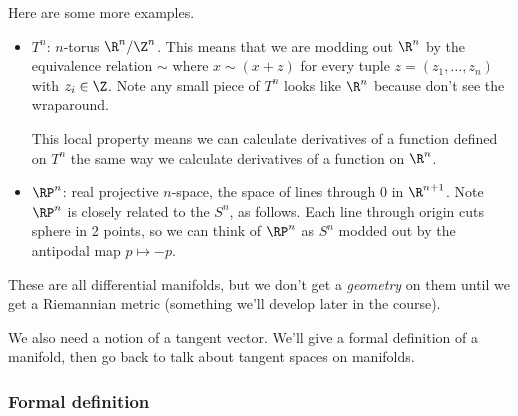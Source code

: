 Here are some more examples.
\begin{itemize}
\item
$T^n$: $n$-torus $\R^n/\Z^n$. This means that we are modding out $\R^n$ by the equivalence relation $\sim$ where $x\sim (x+z)$ for every tuple $z=(z_1,\ldots, z_n)$ with $z_i\in \Z$. Note any small piece of $T^n$ looks like $\R^n$ because don't see the wraparound. 

This local property means we can calculate derivatives of a function defined on $T^n$ the same way we calculate derivatives of a function on $\R^n$.
\item
$\RP^n$: real projective $n$-space, the space of lines through 0 in $\R^{n+1}$. Note $\RP^n$ is closely related to the $S^n$, as follows. Each line through origin cuts sphere in 2 points, so we can think of $\RP^n$ as $S^n$ modded out by the antipodal map $p\mapsto -p$.
\end{itemize}
These are all differential manifolds, %
but we don't get a {\it geometry} on them until we get a Riemannian metric (something we'll develop later in the course).

We also need a notion of a tangent vector. We'll give a formal definition of a manifold, then go back to talk about tangent spaces on manifolds.


\subsubsection{Formal definition}

